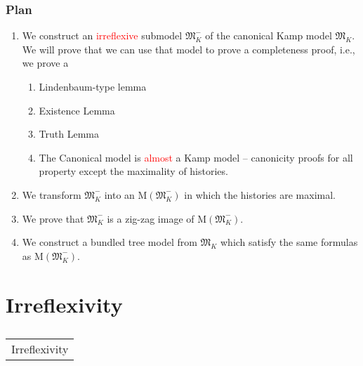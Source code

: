 \documentclass[xcolor=x11names]{beamer}
\makeatletter
\let\beamer@writeslidentry@miniframeson=\beamer@writeslidentry
\def\beamer@writeslidentry@miniframesoff{%
  \expandafter\beamer@ifempty\expandafter{\beamer@framestartpage}{}%
  {%
    \clearpage\beamer@notesactions%
  }
}
\newcommand*{\miniframeson}{\let\beamer@writeslidentry=\beamer@writeslidentry@miniframeson}
\newcommand*{\miniframesoff}{\let\beamer@writeslidentry=\beamer@writeslidentry@miniframesoff}
\newcommand{\cimdia}[1] {\miniframesoff \begin{frame}\begin{center}\huge \begin{tabular}{c}#1\end{tabular}\end{center}\end{frame}\miniframeson}
\newcommand{\szakasz}[2][]{\section{#1}\subsection{}\cimdia{#2}}
\newcommand{\bemph}[1] {{\color{DeepSkyBlue3}{#1}}}
\newcommand{\cemph}[1]{\textcolor{red}{#1}}
\newcommand{\magyi}[1]{\textup{\bemph{\tiny #1}}}
\makeatother
\begin{document}
\begin{frame}[t]
	\frametitle{Plan}
\footnotesize
\begin{enumerate}
\item We construct an \cemph{irreflexive} submodel $\mathfrak M_K^-$ of the canonical Kamp model $\mathfrak M_K$. We will prove that we can use that model to prove a completeness proof, i.e., we prove a
\begin{enumerate}\footnotesize
\item Lindenbaum-type lemma
\item Existence Lemma
\item Truth Lemma
\item The Canonical model is \cemph{almost} a Kamp model -- canonicity proofs for all property except the maximality of histories.
\end{enumerate}
\item We transform $\mathfrak M_K^-$ into an $\mathrm M(\mathfrak M_K^-)$ in which the histories are maximal.
\item We prove that $\mathfrak M_K^-$ is a zig-zag image of $\mathrm M(\mathfrak M_K^-)$. 
\\ \magyi{We can conclude a completeness theorem for Kamp semantics}
\item We construct a bundled tree model from $\mathfrak M_K$ which satisfy the same formulas as $\mathrm M(\mathfrak M_K^-)$.
\\ \magyi{We can conclude a completeness theorem for bundled tree semantics}\end{enumerate}
\end{frame}
\szakasz[Irreflexivity]{Irreflexivity}
\end{document}
